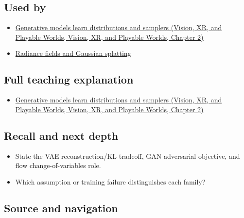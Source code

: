 \subsection{Used by}\label{appendix-2c568f05ee34-used-by}

\begin{itemize}
\tightlist
\item
  \href{../07-Vision-XR-and-Playable-Worlds/main.pdf\#nameddest=04-visual-computing-ii-ch031-generative-models-learn-distributions-and-samplers}{Generative models learn distributions and samplers (Vision, XR, and Playable Worlds, Vision, XR, and Playable Worlds, Chapter 2)}
\item
  \hyperref[appendix-c5b332e400e7]{Radiance fields and Gaussian splatting}
\end{itemize}

\subsection{Full teaching explanation}\label{appendix-2c568f05ee34-full-teaching-explanation}

\begin{itemize}
\tightlist
\item
  \href{../07-Vision-XR-and-Playable-Worlds/main.pdf\#nameddest=04-visual-computing-ii-ch031-generative-models-learn-distributions-and-samplers}{Generative models learn distributions and samplers (Vision, XR, and Playable Worlds, Vision, XR, and Playable Worlds, Chapter 2)}
\end{itemize}

\subsection{Recall and next depth}\label{appendix-2c568f05ee34-recall-and-next-depth}

\begin{itemize}
\tightlist
\item
  State the VAE reconstruction/KL tradeoff, GAN adversarial objective, and flow change-of-variables role.
\item
  Which assumption or training failure distinguishes each family?
\end{itemize}

\subsection{Source and navigation}\label{appendix-2c568f05ee34-source-and-navigation}

